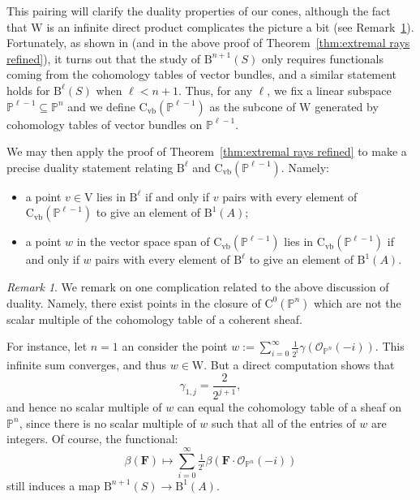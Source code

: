 \documentclass[12pt]{amsart}
\theoremstyle{definition}
\theoremstyle{remark}
\newtheorem{remark}[lemma]{Remark}
\newcommand{\PP}{\mathbb{P}}
\newcommand{\VV}{\mathrm{V}}
\newcommand{\WW}{\mathrm{W}}
\newcommand{\cO}{\mathcal{O}}
\newcommand{\FF}{\mathbf{F}}
\newcommand{\CQ}{\mathrm{C}}
\newcommand{\CvbQ}{\mathrm{C}_{\text{vb}}}
\newcommand{\BBQ}{\mathrm{B}}
\begin{document}
This pairing will clarify the duality properties of our cones, although the fact that $\WW$ is an infinite direct product complicates the picture a bit (see Remark~\ref{rmk:issues}).  Fortunately, as shown in \cite{eis-schrey1} (and in the above proof of Theorem~\ref{thm:extremal rays refined}), it turns out that the study of $\BBQ^{n+1}(S)$ only requires functionals coming from the cohomology tables of vector bundles, and a similar statement holds for $\BBQ^{\ell}(S)$ when $\ell<n+1$.  Thus, for any $\ell$, we fix a linear subspace $\PP^{\ell-1}\subseteq \PP^n$ and we define $\CvbQ(\PP^{\ell-1})$ as the subcone of $\WW$ generated by cohomology tables of vector bundles on $\PP^{\ell-1}$.

We may then apply the proof of Theorem~\ref{thm:extremal rays refined} to make a precise duality statement relating $\BBQ^{\ell}$ and $\CvbQ(\PP^{\ell-1})$.  Namely:
\begin{itemize}
	\item a point $v\in \VV$ lies in $\BBQ^{\ell}$ if and only if $v$ pairs with every element of $\CvbQ(\PP^{\ell-1})$ to give an element of $\BBQ^1(A)$;
	\item a point $w$ in the vector space span of $\CvbQ(\PP^{\ell-1})$ lies in $\CvbQ(\PP^{\ell-1})$ if and only if $w$ pairs with every element of $\BBQ^{\ell}$ to give an element of $\BBQ^1(A)$.
\end{itemize}


\begin{remark}\label{rmk:issues}
We remark on one complication related to the above discussion of duality.  Namely, there exist points in the closure of $\CQ^0(\PP^n)$ which are not the scalar multiple of the cohomology table of a coherent sheaf.   

For instance, let $n=1$ an consider the point $w:=\sum_{i=0}^\infty \frac{1}{2^i} \gamma(\cO_{\PP^n}(-i))$.  
This infinite sum converges, and thus $w\in \WW$.  But a direct computation shows that
\[
\gamma_{1,j}=\frac{2}{2^{j+1}},
\]
and hence no scalar multiple of $w$ can equal the cohomology table of a sheaf on $\PP^n$, since there is no scalar multiple of $w$ such that all of the entries of $w$ are integers.  Of course, the functional:
\[
\beta(\FF)\mapsto \sum_{i=0}^\infty \tfrac{1}{2^i} \beta(\FF\cdot \cO_{\PP^n}(-i))
\]
still induces a map $\BBQ^{n+1}(S)\to \BBQ^1(A)$.
%
\end{remark}
\end{document}
